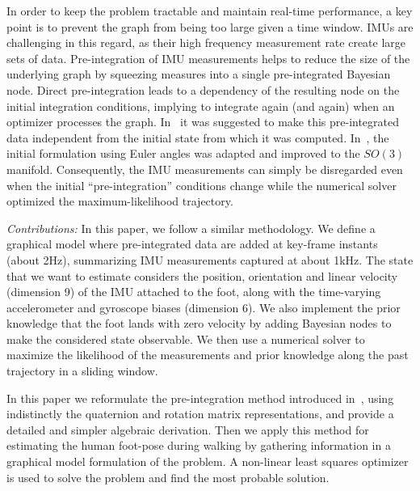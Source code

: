 
In order to keep the problem tractable and maintain real-time performance, a key point is to prevent the graph from being too large given a time window.
IMUs are challenging in this regard, as their high frequency measurement rate create large sets of data. 
Pre-integration of IMU measurements helps to reduce the size of the underlying graph by squeezing measures into a single pre-integrated Bayesian node.
Direct pre-integration leads to a dependency of the resulting node on the initial integration conditions, implying to integrate again (and again) when an optimizer processes the graph.
In~\cite{LUPTON-09} it was suggested to make this pre-integrated data independent from the initial state from which it was computed. In~\cite{forster2015imu}, the initial formulation using Euler angles was adapted and improved to the $SO(3)$ manifold.
Consequently, the IMU measurements can simply be disregarded even when the initial ``pre-integration'' conditions change while the numerical solver optimized the maximum-likelihood trajectory.

\textit{Contributions: }
In this paper, we follow a similar methodology. We define a graphical model where pre-integrated data are added at key-frame instants (about 2Hz), summarizing IMU measurements captured at about 1kHz.
The state that we want to estimate considers the position, orientation and linear velocity (dimension 9) of the IMU attached to the foot, along with the time-varying accelerometer and gyroscope biases (dimension 6).
We also implement the prior knowledge that the foot lands with zero velocity by adding Bayesian nodes to make the considered state observable. 
We then use a numerical solver to maximize the likelihood of the measurements and prior knowledge along the past trajectory in a sliding window. 

In this paper we reformulate the pre-integration method introduced in~\cite{forster2015imu}, using indistinctly the quaternion and rotation matrix representations,
and provide a detailed and simpler algebraic derivation.
Then we apply this method for estimating the human foot-pose during walking by gathering information in a graphical model formulation of the problem.
A non-linear least squares optimizer is used to solve the problem and find the most probable solution.

